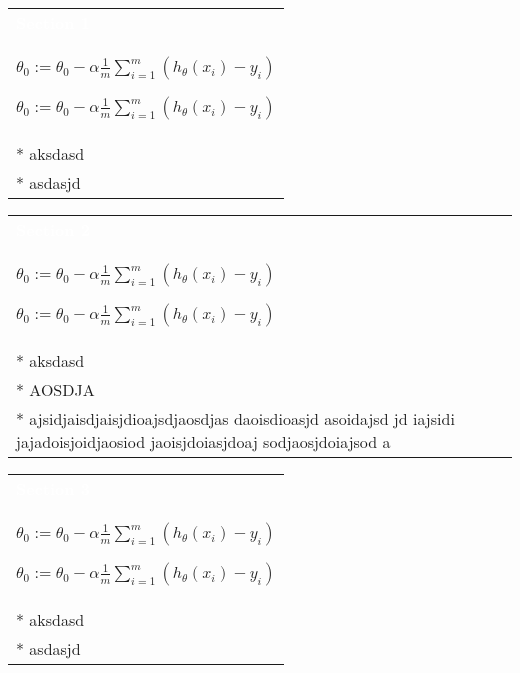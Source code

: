 \documentclass[a4paper,12pt,ngerman,fleqn]{article}
\newcommand{\mybox}[3]{
        \centering
        \begin{tabularx}{0.9\textwidth}{|X|}
            \rowcolor{accent}
            \rule{0pt}{20pt}
            \textcolor{white}{\textbf{#1}} \\
            \def\temp{#2}\ifx\temp\empty
                
            \else
                #2 \\ \hline
            \fi
            #3
            \\ \hline
        \end{tabularx}
    }
\begin{document}
    
    \setlength{\parindent}{0cm}


    \begin{minipage}[t]{.51\textwidth}
        \vspace{1pt}
        \mybox
            {Section 1}
            {\( \theta_0 := \theta_0 - \alpha \frac{1}{m} \sum\limits_{i=1}^{m}(h_\theta(x_{i}) - y_{i}) \)}
            {
                * aksdasd \\
                * asdasjd
            }
        \newline
        \newline
        \newline
        \mybox
            {Section 2}
            {\( \theta_0 := \theta_0 - \alpha \frac{1}{m} \sum\limits_{i=1}^{m}(h_\theta(x_{i}) - y_{i}) \)}
            {
                * aksdasd \\
                * AOSDJA \\
                * ajsidjaisdjaisjdioajsdjaosdjas daoisdioasjd asoidajsd jd iajsidi jajadoisjoidjaosiod jaoisjdoiasjdoaj sodjaosjdoiajsod a
            }
        \newline
        \newline
        \newline
        \mybox
            {Section 3}
            {\( \theta_0 := \theta_0 - \alpha \frac{1}{m} \sum\limits_{i=1}^{m}(h_\theta(x_{i}) - y_{i}) \)}
            {
                * aksdasd \\
                * asdasjd
            }
        \newline
    \end{minipage}%
\end{document}
